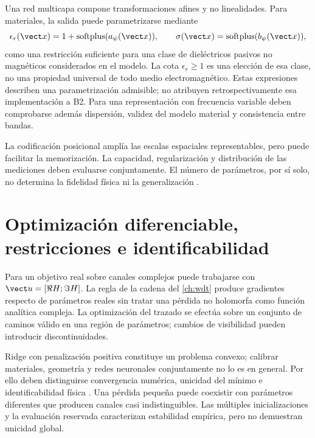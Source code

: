 Una red multicapa compone transformaciones afines y no linealidades. Para materiales,
la salida puede parametrizarse mediante
\begin{equation}
\epsilon_r(\vect x)=1+\operatorname{softplus}(a_\psi(\vect x)),\qquad
\sigma(\vect x)=\operatorname{softplus}(b_\psi(\vect x)),
\label{eq:material_constraints}
\end{equation}
como una restricción suficiente para una clase de dieléctricos pasivos no magnéticos
considerados en el modelo. La cota $\epsilon_r\geq1$ es una elección de esa clase,
no una propiedad universal de todo medio electromagnético. Estas expresiones describen
una parametrización admisible; no atribuyen retrospectivamente esa implementación a B2.
Para una representación con frecuencia variable deben comprobarse además dispersión,
validez del modelo material y consistencia entre bandas.

La codificación posicional amplía las escalas espaciales representables, pero puede
facilitar la memorización. La capacidad, regularización y distribución de las mediciones
deben evaluarse conjuntamente. El número de parámetros, por sí solo, no determina la
fidelidad física ni la generalización \citep{Goodfellow2016DL}.

\section{Optimización diferenciable, restricciones e identificabilidad}

Para un objetivo real sobre canales complejos puede trabajarse con
$\vect u=[\Re H;\Im H]$. La regla de la cadena del \cref{ch:wdt} produce gradientes
respecto de parámetros reales sin tratar una pérdida no holomorfa como función analítica
compleja. La optimización del trazado se efectúa sobre un conjunto de caminos válido
en una región de parámetros; cambios de visibilidad pueden introducir discontinuidades.

Ridge con penalización positiva constituye un problema convexo; calibrar materiales,
geometría y redes neuronales conjuntamente no lo es en general. Por ello deben
distinguirse convergencia numérica, unicidad del mínimo e identificabilidad física
\citep{Boyd2004Convex,KaipioSomersalo2005}. Una pérdida pequeña puede coexistir con
parámetros diferentes que producen canales casi indistinguibles. Las múltiples
inicializaciones y la evaluación reservada caracterizan estabilidad empírica, pero no
demuestran unicidad global.


